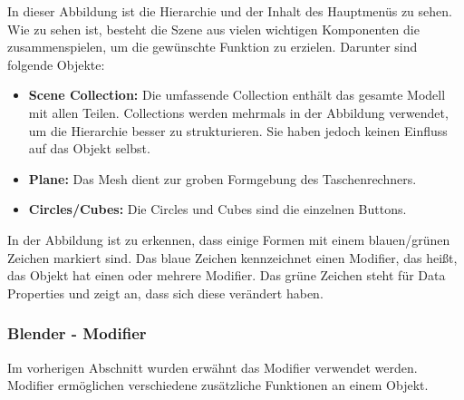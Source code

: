 In dieser Abbildung ist die Hierarchie und der Inhalt des Hauptmenüs zu sehen. Wie zu sehen ist, besteht die Szene aus
vielen wichtigen Komponenten die zusammenspielen, um die gewünschte Funktion zu erzielen. Darunter sind folgende Objekte:

\begin{itemize}
\item \textbf{Scene Collection:} Die umfassende Collection enthält das gesamte Modell mit allen Teilen. Collections
werden mehrmals in der Abbildung verwendet, um die Hierarchie besser zu strukturieren. Sie haben jedoch keinen Einfluss
auf das Objekt selbst.
\item \textbf{Plane:} Das Mesh dient zur groben Formgebung des Taschenrechners.
\item \textbf{Circles/Cubes:} Die Circles und Cubes sind die einzelnen Buttons.
\end{itemize}

In der Abbildung ist zu erkennen, dass einige Formen mit einem blauen/grünen Zeichen markiert sind.
Das blaue Zeichen kennzeichnet einen Modifier, das heißt, das Objekt hat einen oder mehrere Modifier.
Das grüne Zeichen steht für Data Properties und zeigt an, dass sich diese verändert haben.

\subsubsection{Blender - Modifier}
Im vorherigen Abschnitt wurden erwähnt das Modifier verwendet werden. Modifier ermöglichen verschiedene zusätzliche
Funktionen an einem Objekt.

